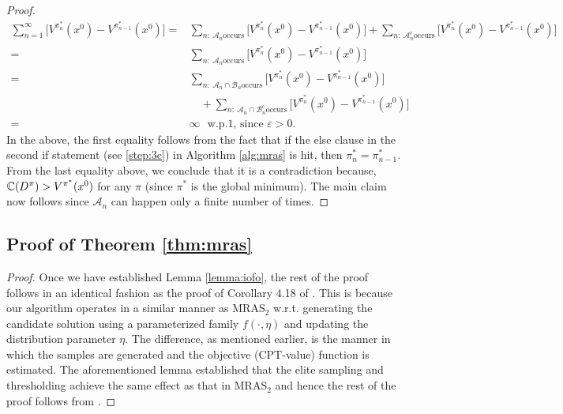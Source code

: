 \begin{proof}
\begin{align*}
\sum_{n=1}^{\infty}\big[V^{\pi^*_n}(x^0)-V^{\pi^*_{n-1}}(x^0)\big] 
=&\sum_{n:~\mathcal{A}_n \text{occurs}}\big[V^{\pi^*_n}(x^0)-V^{\pi^*_{n-1}}(x^0)\big]+\sum_{n:~\mathcal{A}_n^c \text{occurs}}\big[V^{\pi^*_n}(x^0)-V^{\pi^*_{n-1}}(x^0)\big] \\ 
=&\sum_{n:~\mathcal{A}_n \text{occurs}}\big[V^{\pi^*_n}(x^0)-V^{\pi^*_{n-1}}(x^0)\big]\\ 
=&\sum_{n:~\mathcal{A}_n\cap \mathcal{B}_n \text{occurs}}\big[V^{\pi^*_n}(x^0)-V^{\pi^*_{n-1}}(x^0)\big]\\
&\quad +\sum_{n:~\mathcal{A}_n\cap \mathcal{B}_n^c \text{occurs}}\big[V^{\pi^*_n}(x^0)-V^{\pi^*_{n-1}}(x^0)\big] \\ 
=&\infty \text{~~w.p.1, since $\varepsilon>0$.}
\end{align*}
In the above, the first equality follows from the fact that if the else clause in the second if statement (see \ref{step:3c}) in Algorithm \ref{alg:mras} is hit, then $\pi^*_{n} = \pi^*_{n-1}$.
%
From the last equality above, we conclude that it is a contradiction because, $\mathbb{C}(D^\pi) > V^{\pi^*}(x^0)$ for any $\pi$ (since $\pi^*$ is the global minimum). The main claim now follows since $\mathcal{A}_n$ can happen only a finite number of times.
\end{proof}

\subsection*{Proof of Theorem \ref{thm:mras}}
\begin{proof}
Once we have established Lemma \ref{lemma:iofo}, the rest of the proof follows in an identical fashion as the proof of Corollary 4.18 of \cite{chang2013simulation}. This is because our algorithm operates in a similar manner as MRAS$_2$ w.r.t. generating the candidate solution using a parameterized family $f(\cdot, \eta)$ and updating the distribution parameter $\eta$. The difference, as mentioned earlier, is the manner in which the samples are generated and the objective (CPT-value) function is estimated. The aforementioned lemma established that the elite sampling and thresholding achieve the same effect as that in MRAS$_2$ and hence the rest of the proof follows from \cite{chang2013simulation}.
\end{proof}





